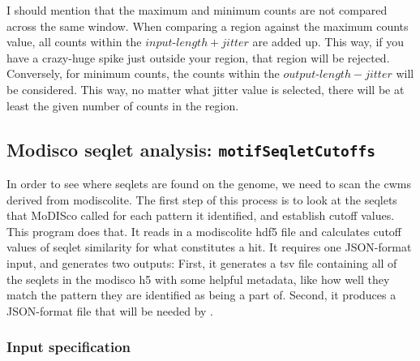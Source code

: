 \documentclass{article}
\begin{document}
I should mention that the maximum and minimum counts are not compared across the same window.
When comparing a region against the maximum counts value, all counts within the
$input\mbox{-}length + jitter$ are added up. This way, if you have a crazy-huge spike just outside
your region, that region will be rejected.
Conversely, for minimum counts, the counts within the $output\mbox{-}length - jitter$ will be
considered. This way, no matter what jitter value is selected, there will be at least the
given number of counts in the region.


\newpage

\subsection{Modisco seqlet analysis: \texttt{motifSeqletCutoffs}}\label{prog:motifSeqletCutoffs}
In order to see where seqlets are found on the genome, we need to scan the cwms derived from
modiscolite.
The first step of this process is to look at the seqlets that MoDISco called for each pattern it
identified, and establish cutoff values.
This program does that.
It reads in a modiscolite hdf5 file and calculates cutoff values of seqlet similarity for what
constitutes a hit.
It requires one JSON-format input, and generates two outputs: First, it generates a tsv file
containing all of the seqlets in the modisco h5 with some helpful metadata, like how well they
match the pattern they are identified as being a part of.
Second, it produces a JSON-format file that will be needed by .

\subsubsection{Input specification}

\end{document}
